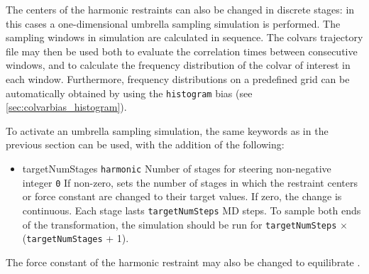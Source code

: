 
The centers of the harmonic restraints can also be changed in discrete stages: in this cases a one-dimensional umbrella sampling simulation is performed.
The sampling windows in simulation are calculated in sequence.
The colvars trajectory file may then be used both to evaluate the correlation times between consecutive windows, and to calculate the frequency distribution of the colvar of interest in each window.
Furthermore, frequency distributions on a predefined grid can be automatically obtained by using the \texttt{histogram} bias (see \ref{sec:colvarbias_histogram}).

To activate an umbrella sampling simulation, the same keywords as in the previous section can be used, with the addition of the following:
\begin{itemize}

\item %
  \keydef
    {targetNumStages}{%
    \texttt{harmonic}}{%
    Number of stages for steering}{%
    non-negative integer}{%
    \texttt{0}}{%
    If non-zero, sets the number of stages in which the restraint centers
    or force constant are changed to their target values. If zero, the change
    is continuous. Each stage lasts \texttt{targetNumSteps} MD steps.
    To sample both ends of the transformation, the simulation
    should be run for \texttt{targetNumSteps} $\times$ (\texttt{targetNumStages} + 1).}

\end{itemize}



The force constant of the harmonic restraint may also be changed to equilibrate \cite{Deng2009}.

